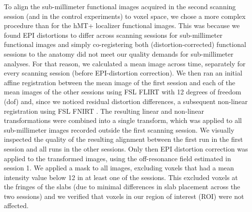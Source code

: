 To align the sub-millimeter functional images acquired in the second scanning session (and in the control experiments) to voxel space, we chose a more complex procedure than for the hMT+ localizer functional images. This was because we found EPI distortions to differ across scanning sessions for sub-millimeter functional images and simply co-registering both (distortion-corrected) functional sessions to the anatomy did not meet our quality demands for sub-millimeter analyses. For that reason, we calculated a mean image across time, separately for every scanning session (before EPI-distortion correction). We then ran an initial affine registration between the mean image of the first session and each of the mean images of the other sessions using FSL FLIRT \parencite{Jenkinson2001, Jenkinson2002} with 12 degrees of freedom (dof) and, since we noticed residual distortion differences, a subsequent non-linear registration using FSL FNIRT \parencite{Andersson2007}. The resulting linear and non-linear transformations were combined into a single transform, which was applied to all sub-millimeter images recorded outside the first scanning session. We visually inspected the quality of the resulting alignment between the first run in the first session and all runs in the other sessions. Only then EPI distortion correction was applied to the transformed images, using the off-resonance field estimated in session 1. We applied a mask to all images, excluding voxels that had a mean intensity value below 12 in at least one of the sessions. This excluded voxels at the fringes of the slabs (due to minimal differences in slab placement across the two sessions) and we verified that voxels in our region of interest (ROI) were not affected.

